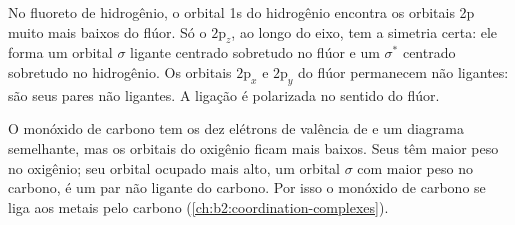 No fluoreto de hidrogênio, o orbital 1s do hidrogênio encontra os orbitais 2p
muito mais baixos do flúor. Só o $2\mathrm p_z$, ao longo do eixo, tem a
simetria certa: ele forma um orbital $\sigma$ ligante centrado sobretudo no
flúor e um $\sigma^*$ centrado sobretudo no hidrogênio. Os orbitais
$2\mathrm p_x$ e $2\mathrm p_y$ do flúor permanecem não ligantes: são seus
pares não ligantes. A ligação é polarizada no sentido do flúor.

O monóxido de carbono tem os dez elétrons de valência de  e um diagrama
semelhante, mas os orbitais do oxigênio ficam mais baixos. Seus  têm maior peso no oxigênio; seu orbital ocupado mais alto, um
orbital $\sigma$ com maior peso no carbono, é um par não ligante do carbono.
Por isso o monóxido de carbono se liga aos metais pelo carbono
(\cref{ch:b2:coordination-complexes}).

